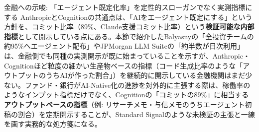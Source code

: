 \begin{insight}{金融への示唆: 「エージェント既定化率」を定性的スローガンでなく実測指標にする}
AnthropicとCognitionの共通点は、「AIをエージェント既定にする」という方針を、コミット比率（89\%、Claude支援コミット比率）という\textbf{検証可能な内部指標}として開示している点にある。本節で紹介したBalyasnyの「全投資チームの約95\%へエージェント配布」\cite{x03balyasny_openai2026}やJPMorgan LLM Suiteの「約半数が日次利用」\cite{x03jpmorgan_cnbc2025}は、金融側でも同種の実測開示が既に始まっていることを示すが、Anthropic・Cognitionほど粒度の細かい生産物ベースの指標（コード生成比率のような「アウトプットのうちAIが作った割合」）を継続的に開示している金融機関はまだ少ない。ファンド・銀行がAI-Native化の進捗を対外的に主張する際は、稼働率のようなインプット指標だけでなく、Cognitionの「コミットの89\%」に相当する\textbf{アウトプットベースの指標}（例: リサーチメモ・与信メモのうちエージェント初稿の割合）を定期開示することが、Standard Signalのような未検証の主張と一線を画す実務的な処方箋になる。
\end{insight}

